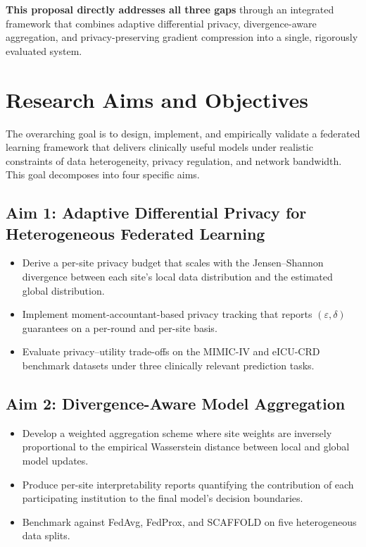 \documentclass[11pt,a4paper]{article}
\begin{document}
{\textbf{This proposal directly addresses all three gaps} through an integrated framework
that combines adaptive differential privacy, divergence-aware aggregation, and
privacy-preserving gradient compression into a single, rigorously evaluated system.


\section{Research Aims and Objectives}

The overarching goal is to design, implement, and empirically validate a federated learning
framework that delivers clinically useful models under realistic constraints of data
heterogeneity, privacy regulation, and network bandwidth. This goal decomposes into four
specific aims.

\subsection{Aim 1: Adaptive Differential Privacy for Heterogeneous Federated Learning}
\vspace{-2pt}
\begin{itemize}
  \item Derive a per-site privacy budget that scales with the Jensen--Shannon divergence
    between each site's local data distribution and the estimated global distribution.
  \item Implement moment-accountant-based privacy tracking that reports $(\varepsilon,\delta)$
    guarantees on a per-round and per-site basis.
  \item Evaluate privacy--utility trade-offs on the MIMIC-IV and eICU-CRD benchmark datasets
    under three clinically relevant prediction tasks.
\end{itemize}

\subsection{Aim 2: Divergence-Aware Model Aggregation}
\vspace{-2pt}
\begin{itemize}
  \item Develop a weighted aggregation scheme where site weights are inversely proportional
    to the empirical Wasserstein distance between local and global model updates.
  \item Produce per-site interpretability reports quantifying the contribution of each
    participating institution to the final model's decision boundaries.
  \item Benchmark against FedAvg, FedProx, and SCAFFOLD on five heterogeneous data splits.
\end{itemize}

}
\end{document}
